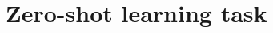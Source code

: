 \documentclass{article}
\newcommand{\bb}[1]{\boldsymbol{#1}}
\begin{document}
	
	




\section{Zero-shot learning task}
\end{document}
